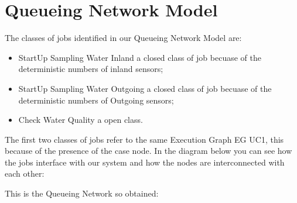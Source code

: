 \chapter{\textbf{Queueing Network Model}}

The classes of jobs identified in our Queueing Network Model are:
\begin{itemize}
\item StartUp Sampling Water Inland a closed class of job becuase of the deterministic numbers of inland sensors;
\item StartUp Sampling Water Outgoing a closed class of job becuase of the deterministic numbers of Outgoing sensors;
\item Check Water Quality a open class.
\end{itemize}

The first two classes of jobs refer to the same Execution Graph EG UC1, this because of the presence of the case node.
In the diagram below you can see how the jobs interface with our system and how the nodes are interconnected with each other:

\bigskip
\begin{center}
\end{center}
\bigskip
{}
\bigskip

This is the Queueing Network so obtained:

\begin{center}
\end{center}
\bigskip
{}

